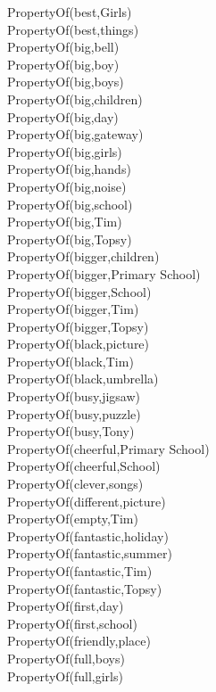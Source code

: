 \begin{multicols}{2}
\begin{footnotesize}
PropertyOf(best,Girls) \\
PropertyOf(best,things) \\
PropertyOf(big,bell) \\
PropertyOf(big,boy) \\
PropertyOf(big,boys) \\
PropertyOf(big,children) \\
PropertyOf(big,day) \\
PropertyOf(big,gateway) \\
PropertyOf(big,girls) \\
PropertyOf(big,hands) \\
PropertyOf(big,noise) \\
PropertyOf(big,school) \\
PropertyOf(big,Tim) \\
PropertyOf(big,Topsy) \\
PropertyOf(bigger,children) \\
PropertyOf(bigger,Primary School) \\
PropertyOf(bigger,School) \\
PropertyOf(bigger,Tim) \\
PropertyOf(bigger,Topsy) \\
PropertyOf(black,picture) \\
PropertyOf(black,Tim) \\
PropertyOf(black,umbrella) \\
PropertyOf(busy,jigsaw) \\
PropertyOf(busy,puzzle) \\
PropertyOf(busy,Tony) \\
PropertyOf(cheerful,Primary School) \\
PropertyOf(cheerful,School) \\
PropertyOf(clever,songs) \\
PropertyOf(different,picture) \\
PropertyOf(empty,Tim) \\
PropertyOf(fantastic,holiday) \\
PropertyOf(fantastic,summer) \\
PropertyOf(fantastic,Tim) \\
PropertyOf(fantastic,Topsy) \\
PropertyOf(first,day) \\
PropertyOf(first,school) \\
PropertyOf(friendly,place) \\
PropertyOf(full,boys) \\
PropertyOf(full,girls) \\

\end{footnotesize}
\end{multicols}
